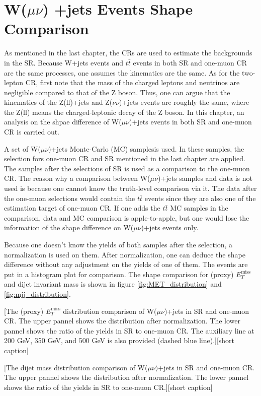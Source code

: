 \documentclass[class=NCU_thesis, crop=false]{standalone}
\begin{document}
\chapter{W($\mu \nu$) +jets Events Shape Comparison}
	As mentioned in the last chapter, the CRs are used to estimate the backgrounds in the SR. Because W+jets events and $t\bar{t}$ events in both SR and one-muon CR are the same processes, one assumes the kinematics are the same. As for the two-lepton CR, first note that the mass of the charged leptons and neutrinos are negligible compared to that of the Z boson. Thus, one can argue that the kinematics of the Z(ll)+jets and Z($\nu \nu$)+jets events are roughly the same, where the Z(ll) means the charged-leptonic decay of the Z boson. In this chapter, an analysis on the shpae difference of W($\mu \nu$)+jets events in both SR and one-muon CR is carried out.
	
	A set of W($\mu \nu$)+jets Monte-Carlo (MC) samplesis used. In these samples, the selection fors one-muon CR and SR mentioned in the last chapter are applied. The samples after the selections of SR is used as a comparison to the one-muon CR. The reason why a comparison between W($\mu \nu$)+jets samples and data is not used is because one cannot know the truth-level comparison via it. The data after the one-muon selections would contain the $t\bar{t}$ events since they are also one of the estimation target of one-muon CR. If one adds the $t\bar{t}$ MC samples in the comparison, data and MC comparison is apple-to-apple, but one would lose the information of the shape difference on W($\mu \nu$)+jets events only.

	Because one doesn't know the yields of both samples after the selection, a normalization is used on them. After normalization, one can deduce the shape difference without any adjustment on the yields of one of them. The events are put in a histogram plot for comparison. The shape comparison for (proxy) $E_T^{\mathrm{miss}}$ and dijet invariant mass is shown in figure \ref{fig:MET_distribution} and \ref{fig:mjj_distribution}.
	
	[The (proxy) $E_T^{\mathrm{miss}}$ distribution comparison of W($\mu \nu$)+jets in SR and one-muon CR. The upper pannel shows the distribution after normalization. The lower pannel shows the ratio of the yields in SR to one-muon CR. The auxiliary line at 200 GeV, 350 GeV, and 500 GeV is also provided (dashed blue line).][short caption]
	
	[The dijet mass distribution comparison of W($\mu \nu)$+jets in SR and one-muon CR. The upper pannel shows the distribution after normalization. The lower pannel shows the ratio of the yields in SR to one-muon CR.][short caption]
	
\end{document}
